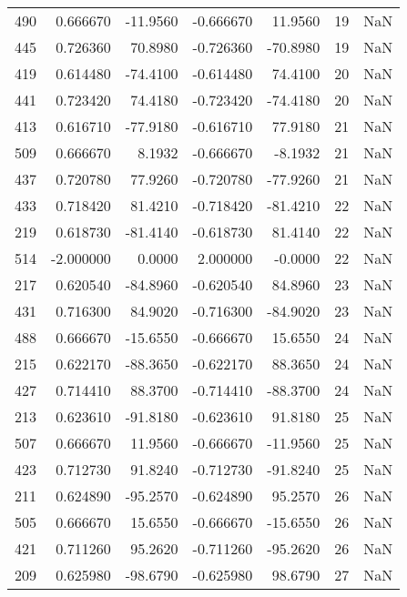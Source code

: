 \begin{tabular}{rrrrrrr}
 490 &    0.666670 &  -11.9560 &   -0.666670 &     11.9560 &          19 & NaN \\
 445 &    0.726360 &   70.8980 &   -0.726360 &    -70.8980 &          19 & NaN \\
 419 &    0.614480 &  -74.4100 &   -0.614480 &     74.4100 &          20 & NaN \\
 441 &    0.723420 &   74.4180 &   -0.723420 &    -74.4180 &          20 & NaN \\
 413 &    0.616710 &  -77.9180 &   -0.616710 &     77.9180 &          21 & NaN \\
 509 &    0.666670 &    8.1932 &   -0.666670 &     -8.1932 &          21 & NaN \\
 437 &    0.720780 &   77.9260 &   -0.720780 &    -77.9260 &          21 & NaN \\
 433 &    0.718420 &   81.4210 &   -0.718420 &    -81.4210 &          22 & NaN \\
 219 &    0.618730 &  -81.4140 &   -0.618730 &     81.4140 &          22 & NaN \\
 514 &   -2.000000 &    0.0000 &    2.000000 &     -0.0000 &          22 & NaN \\
 217 &    0.620540 &  -84.8960 &   -0.620540 &     84.8960 &          23 & NaN \\
 431 &    0.716300 &   84.9020 &   -0.716300 &    -84.9020 &          23 & NaN \\
 488 &    0.666670 &  -15.6550 &   -0.666670 &     15.6550 &          24 & NaN \\
 215 &    0.622170 &  -88.3650 &   -0.622170 &     88.3650 &          24 & NaN \\
 427 &    0.714410 &   88.3700 &   -0.714410 &    -88.3700 &          24 & NaN \\
 213 &    0.623610 &  -91.8180 &   -0.623610 &     91.8180 &          25 & NaN \\
 507 &    0.666670 &   11.9560 &   -0.666670 &    -11.9560 &          25 & NaN \\
 423 &    0.712730 &   91.8240 &   -0.712730 &    -91.8240 &          25 & NaN \\
 211 &    0.624890 &  -95.2570 &   -0.624890 &     95.2570 &          26 & NaN \\
 505 &    0.666670 &   15.6550 &   -0.666670 &    -15.6550 &          26 & NaN \\
 421 &    0.711260 &   95.2620 &   -0.711260 &    -95.2620 &          26 & NaN \\
 209 &    0.625980 &  -98.6790 &   -0.625980 &     98.6790 &          27 & NaN \\

\end{tabular}
